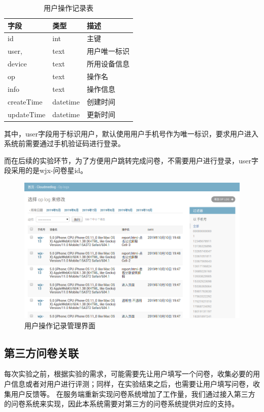 \begin{table}[]
    \centering
    \begin{tabular}{lll}
        \toprule
        字段 & 类型 & 描述 \\ 
        \midrule
        id & int & 主键 \\
        user, & text & 用户唯一标识 \\ 
        device & text & 所用设备信息 \\
        op & text & 操作名 \\
        info & text & 操作信息 \\
        createTime & datetime & 创建时间 \\
        updateTime & datetime & 更新时间\\
        \bottomrule
    \end{tabular}
    \caption{用户操作记录表}
    \label{tab:op_log}
\end{table}


其中，user字段用于标识用户，默认使用用户手机号作为唯一标识，要求用户进入系统前需要通过手机验证码进行登录。


而在后续的实验环节，为了方便用户跳转完成问卷，不需要用户进行登录，user字段采用的是wjx-问卷星id。

\begin{figure}[ht]
    \centering
    \includegraphics[width=12cm]{images/op_log.png}
    \caption{用户操作记录管理界面}
    \label{fig:op_log}
\end{figure}

\subsection{第三方问卷关联}
每次实验之前，根据实验的需求，可能需要先让用户填写一个问卷，收集必要的用户信息或者对用户进行评测；同样，在实验结束之后，也需要让用户填写问卷，收集用户反馈等。
在服务端重新实现问卷系统增加了工作量，我们通过接入第三方的问卷系统来实现，因此本系统需要对第三方的问卷系统提供对应的支持。


